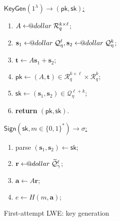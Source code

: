 \documentclass{template}
\makeatletter
\newcommand\leftarrowS{\leftarrow\joinrel\smalldollar}
\newcommand{\smalldollar}{\mathrel{\mathpalette\small@dollar\relax}}
\newcommand{\small@dollar}[2]{%
  \vcenter{\hbox{%
    $#1\textnormal{\fontsize{0.7\dimexpr\f@size pt}{0}\selectfont\$}$%
  }}%
}
\makeatother
\begin{document}
\begin{figure}[ht]
\centering
\footnotesize 

\begin{minipage}[t]{0.32\linewidth}
    \begin{mdframed}[linecolor=black, linewidth=1.0pt,
                     skipabove=5pt, skipbelow=5pt,
                     innerleftmargin=5pt, innerrightmargin=5pt]
        \centering
        \colorbox{purple!10}{\underline{$\mathsf{KeyGen}(1^{\lambda}) \to (\mathsf{pk},\mathsf{sk})$:}}
        \begin{enumerate}
            \item $A \leftarrowS \mathcal{R}_q^{k \times \ell}$;
            \item $\mathbf{s}_1 \leftarrowS \mathcal{Q}_{\eta}^{\ell}, \mathbf{s}_2 \leftarrowS \mathcal{Q}_{\eta}^{k}$;
            \item $\mathbf{t} \gets A\mathbf{s}_1 + \mathbf{s}_2$;
            \item $\mathsf{pk} \gets (A,\mathbf{t}) \in \mathcal{R}_q^{k \times \ell} \times \mathcal{R}_q^{k}$;
            \item $\mathsf{sk} \gets (\mathbf{s}_1,\mathbf{s}_2) \in \mathcal{Q}_{\eta}^{\ell+k}$;
            \item \textbf{return} $(\mathsf{pk},\mathsf{sk})$.
        \end{enumerate}
    \end{mdframed}
    \caption{First-attempt LWE: key generation}
    \label{fig:first-attempt-keygen}
\end{minipage}
\hfill
\begin{minipage}[t]{0.32\linewidth}
    \begin{mdframed}[linecolor=black, linewidth=1.0pt,
                     skipabove=5pt, skipbelow=5pt,
                     innerleftmargin=5pt, innerrightmargin=5pt]
        \centering
        \colorbox{green!10}{\underline{$\mathsf{Sign}(\mathsf{sk}, m \in \{0,1\}^*) \to \sigma$:}}
        \begin{enumerate}
            \item parse $(\mathbf{s}_1,\mathbf{s}_2) \gets \mathsf{sk}$;
            \item $\mathbf{r} \leftarrowS \widetilde{\mathcal{Q}}_{\gamma}^{\ell}$;
            \item $\mathbf{a} \gets A\mathbf{r}$; 
            \item $e \gets H(m,\mathbf{a})$; 

\end{enumerate}
\end{mdframed}
\end{minipage}
\end{figure}
\end{document}
